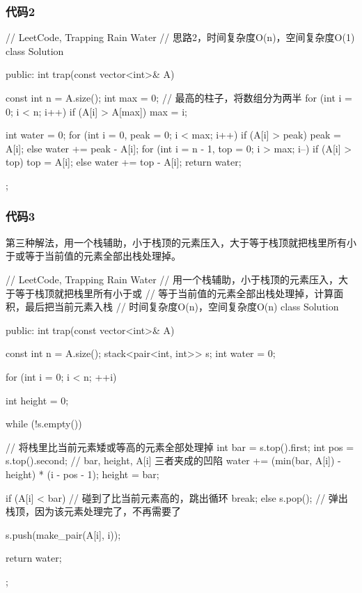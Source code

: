 \subsubsection{代码2}
\begin{Code}
// LeetCode, Trapping Rain Water
// 思路2，时间复杂度O(n)，空间复杂度O(1)
class Solution {
public:
    int trap(const vector<int>& A) {
        const int n = A.size();
        int max = 0; // 最高的柱子，将数组分为两半
        for (int i = 0; i < n; i++)
            if (A[i] > A[max]) max = i;

        int water = 0;
        for (int i = 0, peak = 0; i < max; i++)
            if (A[i] > peak) peak = A[i];
            else water += peak - A[i];
        for (int i = n - 1, top = 0; i > max; i--)
            if (A[i] > top) top = A[i];
            else water += top - A[i];
        return water;
    }
};
\end{Code}


\subsubsection{代码3}
第三种解法，用一个栈辅助，小于栈顶的元素压入，大于等于栈顶就把栈里所有小于或等于当前值的元素全部出栈处理掉。
\begin{Code}
// LeetCode, Trapping Rain Water
// 用一个栈辅助，小于栈顶的元素压入，大于等于栈顶就把栈里所有小于或
// 等于当前值的元素全部出栈处理掉，计算面积，最后把当前元素入栈
// 时间复杂度O(n)，空间复杂度O(n)
class Solution {
public:
    int trap(const vector<int>& A) {
        const int n = A.size();
        stack<pair<int, int>> s;
        int water = 0;

        for (int i = 0; i < n; ++i) {
            int height = 0;

            while (!s.empty()) { // 将栈里比当前元素矮或等高的元素全部处理掉
                int bar = s.top().first;
                int pos = s.top().second;
                // bar, height, A[i] 三者夹成的凹陷
                water += (min(bar, A[i]) - height) * (i - pos - 1);
                height = bar;

                if (A[i] < bar) // 碰到了比当前元素高的，跳出循环
                    break;
                else
                    s.pop(); // 弹出栈顶，因为该元素处理完了，不再需要了
            }

            s.push(make_pair(A[i], i));
        }

        return water;
    }
};
\end{Code}


